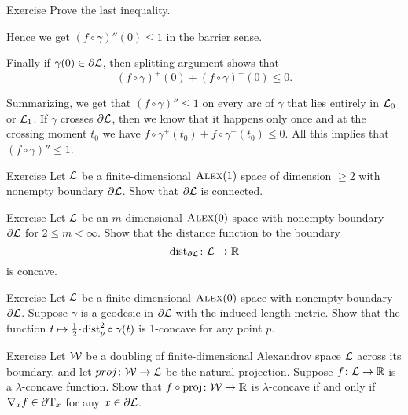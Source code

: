 \begin{thm}{Exercise}\label{ex:pz<ypz}
Prove the last inequality.
\end{thm}

Hence we get $(f\circ\gamma)''(0)\le 1$ in the barrier sense.

Finally if $\gamma(0)\in\partial\mathcal{L}$, then splitting argument shows that 
\[(f\circ\gamma)^+(0)+(f\circ\gamma)^-(0)\le 0.\]

Summarizing, we get that $(f\circ\gamma)''\le 1$ on every arc of $\gamma$ that lies entirely in $\mathcal{L}_0$ or $\mathcal{L}_1$.
If $\gamma$ crosses $\partial \mathcal{L}$, then we know that it happens only once and at the crossing moment $t_0$ 
we have $f\circ\gamma^+(t_0)+f\circ\gamma^-(t_0)\le 0$.
All this implies that $(f\circ\gamma)''\le 1$.
\qeds

\begin{thm}{Exercise}\label{ex:bry-connected}
Let $\mathcal{L}$ be a finite-dimensional $\textsc{Alex}(1)$ space of dimension $\ge 2$ with nonempty boundary $\partial\mathcal{L}$.
Show that $\partial\mathcal{L}$ is connected.
\end{thm}


\begin{thm}{Exercise}\label{ex:dist-to-bry}
Let $\mathcal{L}$ be an $m$-dimensional $\textsc{Alex}(0)$ space with nonempty boundary $\partial\mathcal{L}$
for $2\le m<\infty$.
Show that the distance function to the boundary
\[\mathrm{dist}_{\partial\mathcal{L}}\colon\mathcal{L}\to\mathbb{R}\]
is concave.
\end{thm}

\begin{thm}{Exercise}\label{ex:liberman}
Let $\mathcal{L}$ be a finite-dimensional $\textsc{Alex}(0)$ space with nonempty boundary $\partial\mathcal{L}$.
Suppose $\gamma$ is a geodesic in $\partial\mathcal{L}$ with the induced length metric.
Show that the function $t\mapsto \tfrac12\cdot\distfun_p^2\circ\gamma(t)$ is 1-concave for any point $p$. 
\end{thm}

\begin{thm}{Exercise}\label{ex:native}
Let $\mathcal{W}$ be a doubling of finite-dimensional Alexandrov space $\mathcal{L}$ across its boundary,
and let $proj\colon\mathcal{W}\to\mathcal{L}$ be the natural projection.
Suppose $f\colon\mathcal{L}\to\mathbb{R}$ is a $\lambda$-concave function.
Show that $f\circ\operatorname{\rm proj}\nolimits\colon\mathcal{W}\to\mathbb{R}$ is $\lambda$-concave if and only if $\nabla_xf\in \partial \mathrm{T}_x$ 
for any $x\in\partial \mathcal{L}$.
\end{thm}



